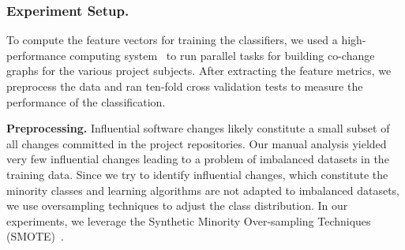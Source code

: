 
\subsubsection{Experiment Setup.}\label{sec:experiment}
To compute the feature vectors for training the classifiers, we used 
a high-performance computing system~\cite{VBCG_HPCS14} to run parallel tasks for
building co-change graphs for the various project subjects. After extracting the
feature metrics, we preprocess the data and ran ten-fold cross validation
tests to measure the performance of the classification.

\textbf{Preprocessing.}
Influential software changes likely constitute a small subset of all changes
committed in the project repositories. Our manual analysis yielded very few
influential changes leading to a problem of imbalanced datasets in the training
data.
Since we try to identify influential changes, which constitute the minority
classes and learning algorithms are not adapted to imbalanced datasets, we use oversampling
techniques to adjust the class distribution. In our experiments, we leverage
the Synthetic Minority Over-sampling Techniques (SMOTE)~\cite{al.2002}.

